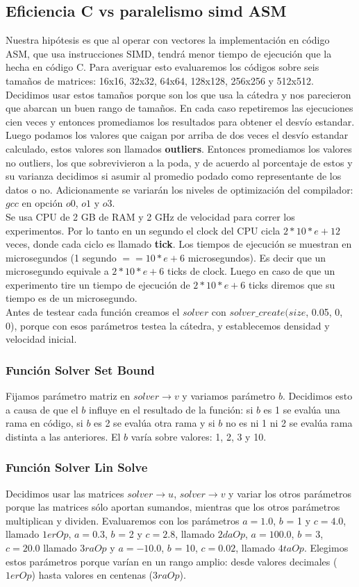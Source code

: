 \subsection{Eficiencia C vs paralelismo simd ASM}
Nuestra hipótesis es que al operar con vectores la implementación en código ASM, que usa instrucciones SIMD, tendrá menor tiempo de ejecución que la hecha en código C. Para averiguar esto evaluaremos los códigos sobre seis tamaños de matrices: 16x16, 32x32, 64x64, 128x128, 256x256 y 512x512. Decidimos usar estos tamaños porque son los que usa la cátedra y nos parecieron que abarcan un buen rango de tamaños. En cada caso repetiremos las ejecuciones cien veces y entonces promediamos los resultados para obtener el desvío estandar. Luego podamos los valores que caigan por arriba de dos veces el desvío estandar calculado, estos valores son llamados \textbf{outliers}. Entonces promediamos los valores no outliers, los que sobrevivieron a la poda, y de acuerdo al porcentaje de estos y su varianza decidimos si asumir al promedio podado como representante de los datos o no. Adicionamente se variarán los niveles de optimización del compilador: $gcc$ en opción $o0$, $o1$ y $o3$.\\

Se usa CPU de 2 GB de RAM y 2 GHz de velocidad para correr los experimentos. Por lo tanto en un segundo el clock del CPU cicla $2*10*e+12$ veces, donde cada ciclo es llamado \textbf{tick}. Los tiempos de ejecución se muestran en microsegundos (1 segundo $== 10*e+6$ microsegundos). Es decir que un microsegundo equivale a $2*10*e+6$ ticks de clock. Luego en caso de que un experimento tire un tiempo de ejecución de $2*10*e+6$ ticks diremos que su tiempo es de un microsegundo.\\

Antes de testear cada función creamos el $solver$ con $solver\_create(size$, 0.05, 0, 0), porque con esos parámetros testea la cátedra, y establecemos densidad y velocidad inicial.
\subsubsection{Función Solver Set Bound}
Fijamos parámetro matriz en $solver\rightarrow v$ y variamos parámetro $b$. Decidimos esto a causa de que el $b$ influye en el resultado de la función: si $b$ es 1 se evalúa una rama en código, si $b$ es 2 se evalúa otra rama y si $b$ no es ni 1 ni 2 se evalúa rama distinta a las anteriores.
El $b$ varía sobre valores: 1, 2, 3 y 10.
\subsubsection{Función Solver Lin Solve}
Decidimos usar las matrices $solver\rightarrow u$, $solver\rightarrow v$ y variar los otros parámetros porque las matrices sólo aportan sumandos, mientras que los otros parámetros multiplican y dividen.
Evaluaremos con los parámetros $a = 1.0 $, $b$ = 1 y $c = 4.0$, llamado $1erOp$, $a = 0.3$, $b$ = 2 y $c = 2.8$, llamado $2daOp$, $a = 100.0$, $b$ = 3, $c = 20.0$ llamado $3raOp$ y $a = -10.0$, $b$ = 10, $c = 0.02$, llamado $4taOp$. Elegimos estos parámetros porque varían en un rango amplio: desde valores decimales ($1erOp$) hasta valores en centenas ($3raOp$).


